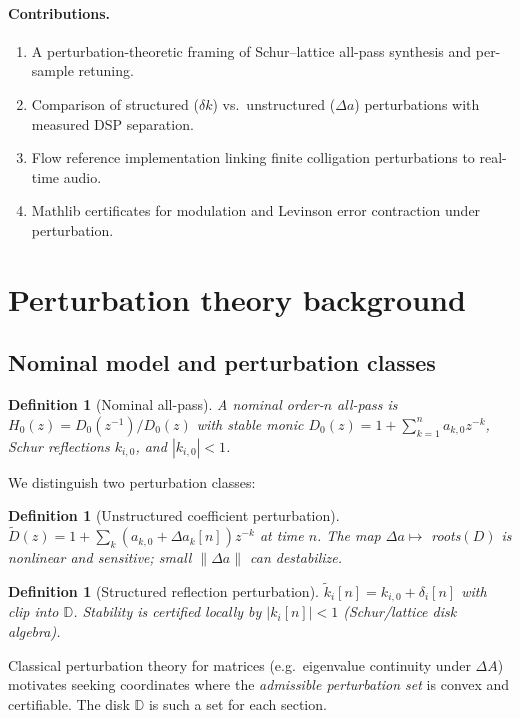 \documentclass[11pt]{article}
\newtheorem{definition}[theorem]{Definition}
\begin{document}
\paragraph{Contributions.}
\begin{enumerate}
  \item A perturbation-theoretic framing of Schur--lattice all-pass synthesis and per-sample retuning.
  \item Comparison of structured ($\delta k$) vs.\ unstructured ($\Delta a$) perturbations with measured DSP separation.
  \item Flow reference implementation linking finite colligation perturbations to real-time audio.
  \item Mathlib certificates for modulation and Levinson error contraction under perturbation.
\end{enumerate}

\section{Perturbation theory background}

\subsection{Nominal model and perturbation classes}

\begin{definition}[Nominal all-pass]
A nominal order-$n$ all-pass is $H_0(z)=D_0(z^{-1})/D_0(z)$ with stable monic $D_0(z)=1+\sum_{k=1}^n a_{k,0} z^{-k}$, Schur reflections $k_{i,0}$, and $|k_{i,0}|<1$.
\end{definition}

We distinguish two perturbation classes:

\begin{definition}[Unstructured coefficient perturbation]
$\tilde D(z)=1+\sum_k (a_{k,0}+\Delta a_k[n]) z^{-k}$ at time $n$. The map $\Delta a\mapsto$ roots$(D)$ is nonlinear and sensitive; small $\|\Delta a\|$ can destabilize.
\end{definition}

\begin{definition}[Structured reflection perturbation]
$\tilde k_i[n]=k_{i,0}+\delta_i[n]$ with clip into $\mathbb{D}$. Stability is certified locally by $|k_i[n]|<1$ (Schur/lattice disk algebra).
\end{definition}

Classical perturbation theory for matrices (e.g.\ eigenvalue continuity under $\Delta A$) motivates seeking coordinates where the \emph{admissible perturbation set} is convex and certifiable. The disk $\mathbb{D}$ is such a set for each section.
\end{document}
